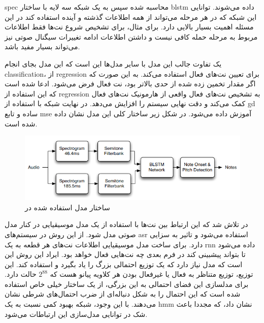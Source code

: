 \gls{spec} محاسبه شده سپس به یک شبکه سه لایه با ساختار \gls{blstm} داده می‌شوند.
توانایی این شبکه که در هر مرحله می‌تواند از همه اطلاعات گذشته و آینده استفاده
کند در این مسئله اهمیت بسیار بالایی دارد. برای مثال، برای تشخیص شروع نت‌ها فقط
اطلاعات مربوط به مرحله حمله کافی نیست و داشتن اطلاعات ادامه تغییرات سیگنال صوتی
نیز می‌تواند بسیار مفید باشد.

یک تفاوت جالب این مدل با سایر مدل‌ها این است که این مدل بجای انجام
\gls{classification}، از \gls{regression} برای تعیین نت‌های فعال استفاده می‌کند.
به این صورت که اگر مقدار تخمین زده شده از حدی بالاتر بود، نت فعال فرض می‌شود.
ادعا شده است که این استفاده از \gls{regression} به تشخیص نت‌های فعال واقعی از
هارمونیک نت‌های فعال کمک می‌کند و دقت نهایی سیستم را افزایش می‌دهد. در نهایت
شبکه با استفاده از \gls{gd} ساده و تابع \gls{mse} آموزش داده می‌شود. در شکل
زیر ساختار کلی این مدل نشان داده شده است.
\begin{figure}[ht]
    \centering
    \includegraphics[width=12cm]{./statics/bock2012polyphonic_architecture.png}
    \caption{ساختار مدل استفاده شده در \cite{bock2012polyphonic}}
\end{figure}

در \cite{sigtia2016end} تلاش شد که این ارتباط بین نت‌ها با استفاده از یک مدل
موسیقیایی در کنار مدل صوتی مدل شود. از این روش در سیستم‌های \gls{asr} استفاده
می‌شود و تاثیر به سزایی دارد. برای ساخت مدل موسیقیایی اطلاعات نت‌های هر قطعه به
یک \gls{rnn} داده می‌شود تا بتواند پیشبینی کند در فرم بعدی چه نت‌هایی فعال خواهد
بود. ایراد این روش این است که مدل نیاز دارد که یک توزیع احتمالی بزرگ را یاد
بگیرد و استفاده کند. این توزیع، توزیع متناظر به فعال یا غیرفعال بودن هر کلاویه
پیانو هست که $2^{88}$ حالت دارد. برای مدلسازی این فضای احتمالی به این بزرگی، از
یک ساختار خیلی خاص استفاده شده است که این احتمال را به شکل دنباله‌ای از ضرب
احتمال‌های شرطی نشان می‌دهند. با این وجود، شبکه بهبود کمی نسبت به یک \gls{hmm}
نشان داد، که مجددا باعث شک در توانایی مدل‌سازی این ارتباطات می‌شود.

